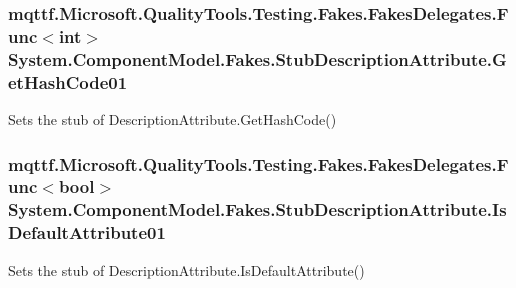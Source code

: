 \hypertarget{class_system_1_1_component_model_1_1_fakes_1_1_stub_description_attribute_a7f551a8acc7df77ce53786065f6dc41b}{
\subsubsection[{Get\-Hash\-Code01}]{\setlength{\rightskip}{0pt plus 5cm}mqttf.\-Microsoft.\-Quality\-Tools.\-Testing.\-Fakes.\-Fakes\-Delegates.\-Func$<$int$>$ System.\-Component\-Model.\-Fakes.\-Stub\-Description\-Attribute.\-Get\-Hash\-Code01}}\label{class_system_1_1_component_model_1_1_fakes_1_1_stub_description_attribute_a7f551a8acc7df77ce53786065f6dc41b}


Sets the stub of Description\-Attribute.\-Get\-Hash\-Code()

\hypertarget{class_system_1_1_component_model_1_1_fakes_1_1_stub_description_attribute_a7d6f1a189c0f87b3801ccbe8acf4deda}{
\subsubsection[{Is\-Default\-Attribute01}]{\setlength{\rightskip}{0pt plus 5cm}mqttf.\-Microsoft.\-Quality\-Tools.\-Testing.\-Fakes.\-Fakes\-Delegates.\-Func$<$bool$>$ System.\-Component\-Model.\-Fakes.\-Stub\-Description\-Attribute.\-Is\-Default\-Attribute01}}\label{class_system_1_1_component_model_1_1_fakes_1_1_stub_description_attribute_a7d6f1a189c0f87b3801ccbe8acf4deda}


Sets the stub of Description\-Attribute.\-Is\-Default\-Attribute()

